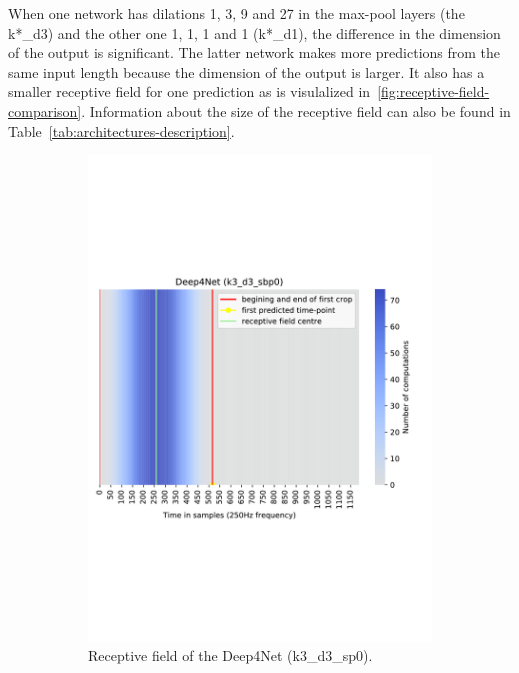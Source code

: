 When one network has dilations 1, 3, 9 and 27 in the max-pool layers (the k*\_d3) and the other one 1, 1, 1 and 1 (k*\_d1), the difference in the dimension of the output is significant.
The latter network makes more predictions from the same input length because the dimension of the output is larger.
It also has a smaller receptive field for one prediction as is visulalized in~\cref{fig:receptive-field-comparison}.
Information about the size of the receptive field can also be found in Table~\ref{tab:architectures-description}.

\begin{figure}[!htpb]
\centering
\begin{subfigure}[b]{0.44\textwidth}
   \includegraphics[width=\linewidth]{img/ch3/deep4net-receptive-field}
   \caption{Receptive field of the Deep4Net (k3\_d3\_sp0).}
\end{subfigure}
\begin{subfigure}[b]{0.44\textwidth}

\end{subfigure}
\end{figure}
